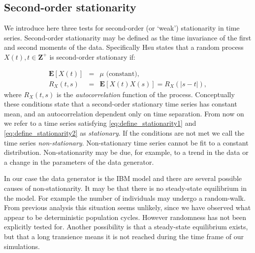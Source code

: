

\subsection{Second-order stationarity}
\label{sec:stationarity}



We introduce here three tests for second-order (or `weak') stationarity in time series.  Second-order stationarity may be defined as the time invariance of the first and second moments of the data. Specifically Hsu \cite{hsu1997schaum} states that a random process $X(t), t \in \mathbf{Z}^+$ is second-order stationary if:

\begin{eqnarray}
	\mathbf{E}[X(t)] &=& \mu \text{ (constant),}\label{eq:define_stationarity1}\\
	R_X(t,s) &=& \mathbf{E}[X(t)X(s)] = R_X(|s-t|),\label{eq:define_stationarity2}
\end{eqnarray}
%
where $R_X(t,s)$ is the \emph{autocorrelation} function of the process. Conceptually these conditions state that a second-order stationary time series has constant mean, and an autocorrelation dependent only on time separation. From now on we refer to a time series satisfying \ref{eq:define_stationarity1} and \ref{eq:define_stationarity2} as \emph{stationary}. If the conditions are not met we call the time series \emph{non-stationary}. Non-stationary time series cannot be fit to a constant distribution. Non-stationarity may be due, for example, to a trend in the data or a change in the parameters of the data generator.

In our case the data generator is the IBM model and there are several possible causes of non-stationarity. It may be that there is no steady-state equilibrium in the model. For example the number of individuals may undergo a random-walk. From previous analysis this situation seems unlikely, since we have observed what appear to be deterministic population cycles. However randomness has not been explicitly tested for. Another possibility is that a steady-state equilibrium exists, but that a long transience  means it is not reached during the time frame of our simulations.

